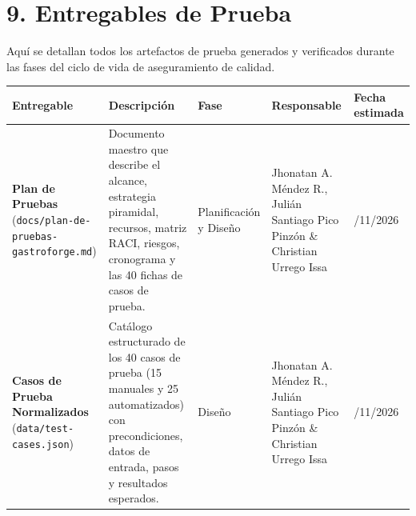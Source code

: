 \documentclass[10pt,a4paper]{article}
\newcounter{none}
\begin{document}

\section{9. Entregables de Prueba}\label{9-entregables-de-prueba}

Aquí se detallan todos los artefactos de prueba generados y verificados durante las fases del ciclo de vida de aseguramiento de calidad.

\begingroup\singlespacing\footnotesize\setlength{\parskip}{0pt}

{\def\LTcaptype{none} %
\begin{longtable}[]{@{}
  >{\raggedright\arraybackslash}p{}
  >{\raggedright\arraybackslash}p{}
  >{\raggedright\arraybackslash}p{}
  >{\raggedright\arraybackslash}p{}
  >{\raggedright\arraybackslash}p{}@{}}
\toprule\noalign{}
\begin{minipage}[b]{\linewidth}\raggedright
Entregable
\end{minipage} & \begin{minipage}[b]{\linewidth}\raggedright
Descripción
\end{minipage} & \begin{minipage}[b]{\linewidth}\raggedright
Fase
\end{minipage} & \begin{minipage}[b]{\linewidth}\raggedright
Responsable
\end{minipage} & \begin{minipage}[b]{\linewidth}\raggedright
Fecha estimada
\end{minipage} \\
\midrule\noalign{}
\endhead
\bottomrule\noalign{}
\endlastfoot
\textbf{Plan de Pruebas} (\texttt{docs/\allowbreak{}plan-{}\allowbreak{}de-{}\allowbreak{}pruebas-{}\allowbreak{}gastroforge.\allowbreak{}md}) & Documento maestro que describe el alcance, estrategia piramidal, recursos, matriz RACI, riesgos, cronograma y las 40 fichas de casos de prueba. & Planificación y Diseño & Jhonatan A. Méndez R., Julián Santiago Pico Pinzón \& Christian Urrego Issa & 16/11/2026 \\
\textbf{Casos de Prueba Normalizados} (\texttt{data/\allowbreak{}test-{}\allowbreak{}cases.\allowbreak{}json}) & Catálogo estructurado de los 40 casos de prueba (15 manuales y 25 automatizados) con precondiciones, datos de entrada, pasos y resultados esperados. & Diseño & Jhonatan A. Méndez R., Julián Santiago Pico Pinzón \& Christian Urrego Issa & 16/11/2026 \\

\end{longtable}}
\end{document}
